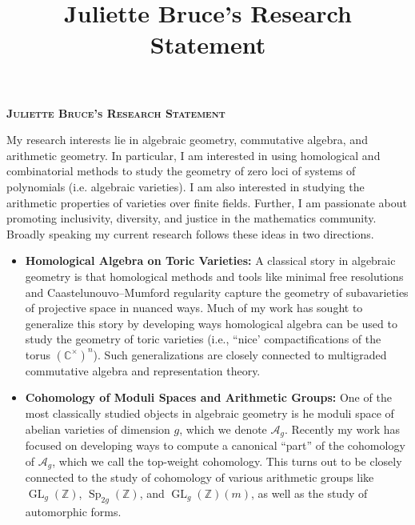 \documentclass[11pt,reqno]{amsart}
\title{Juliette Bruce's Research Statement}
\theoremstyle{remark}
\newcommand{\GL}{{\operatorname{GL}}}
\newcommand{\Sp}{\operatorname{Sp}}
\newcommand{\C}{\mathbb{C}}
\newcommand{\Z}{\mathbb{Z}}
\begin{document}
 

\begingroup  
  \centering
  \large\scshape\bfseries Juliette Bruce's Research Statement\\[1em]
\endgroup


\setcounter{section}{0}

My research interests lie in algebraic geometry, commutative algebra, and arithmetic geometry. In particular, I am interested in using homological and combinatorial methods to study the geometry of zero loci of systems of polynomials (i.e. algebraic varieties). I am also interested in studying the arithmetic properties of varieties over finite fields. Further, I am passionate about promoting inclusivity, diversity, and justice in the mathematics community. Broadly speaking my current research follows these ideas in two directions. 

\begin{itemize}[leftmargin=*]
\item \textbf{Homological Algebra on Toric Varieties:} A classical story in algebraic geometry is that homological methods and tools like minimal free resolutions and Caastelunouvo--Mumford regularity capture the geometry of subavarieties of projective space in nuanced ways. Much of my work has sought to generalize this story by developing ways homological algebra can be used to study the geometry of toric varieties (i.e., ``nice' compactifications of the torus $(\C^{\times})^{n}$). Such generalizations are closely connected to multigraded commutative algebra and representation theory.

\item \textbf{Cohomology of Moduli Spaces and Arithmetic Groups:} One of the most classically studied objects in algebraic geometry is he moduli space of abelian varieties of dimension $g$, which we denote $\mathcal{A}_{g}$. Recently my work has focused on developing ways to compute a canonical ``part'' of the cohomology of $\mathcal{A}_{g}$, which we call the top-weight cohomology. This turns out to be closely connected to the study of cohomology of various arithmetic groups like $\GL_{g}(\Z)$, $\Sp_{2g}(\Z)$, and $\GL_{g}(\Z)(m)$, as well as the study of automorphic forms. 

\end{itemize}
\end{document}
